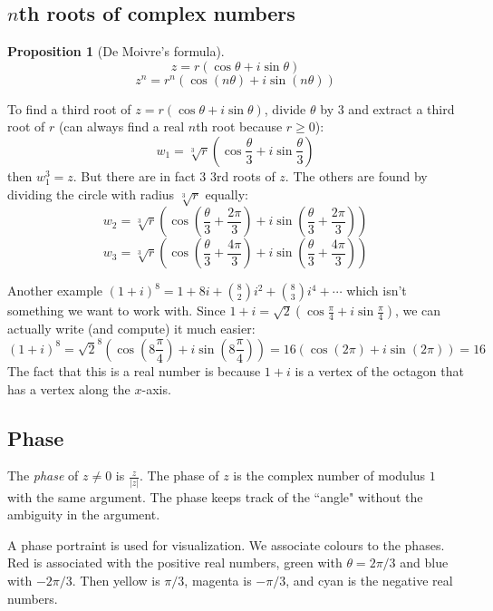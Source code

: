 \documentclass{article}
\theoremstyle{plain}
\newtheorem{proposition}{Proposition}
\theoremstyle{remark}
\begin{document}
\subsection{$n$th roots of complex numbers}
\begin{proposition}[De Moivre's formula]
	\[
		z  = r(\cos\theta + i\sin\theta)
	\]
	\[
		z^n = r^n(\cos(n\theta) + i\sin(n\theta))
	\]
\end{proposition}
To find a third root of $z = r(\cos\theta + i\sin\theta)$,
divide $\theta$ by $3$ and extract a third root of $r$
(can always find a real $n$th root because $r \geq 0$):
\[
	w_1 = \sqrt[3]{r}\left(\cos\frac{\theta}{3} + i\sin\frac{\theta}{3}\right)
\]
then $w_1^3 = z$.
But there are in fact $3$ 3rd roots of $z$.
The others are found by dividing the circle with radius $\sqrt[3]{r}$ equally:
\[
	w_2 = \sqrt[3]{r}\left(\cos\left(\frac{\theta}{3} + \frac{2\pi}{3}\right)
		+ i\sin\left(\frac{\theta}{3} + \frac{2\pi}{3}\right)\right)
\]
\[
	w_3 = \sqrt[3]{r}\left(\cos\left(\frac{\theta}{3} + \frac{4\pi}{3}\right)
		+ i\sin\left(\frac{\theta}{3} + \frac{4\pi}{3}\right)\right)
\]

Another example $(1+i)^8 = 1 + 8i + \binom{8}{2}i^2 + \binom{8}{3}i^4 + \cdots$
which isn't something we want to work with.
Since $1+i = \sqrt{2}\left(\cos\frac{\pi}{4} + i\sin\frac{\pi}{4}\right)$,
we can actually write (and compute) it much easier:
\[
	(1+i)^8 = \sqrt{2}^8\left(\cos\left(8\frac{\pi}{4}\right) +
		i\sin\left(8\frac{\pi}{4}\right)\right)
		= 16 \left(\cos(2\pi) + i\sin(2\pi)\right) = 16
\]
The fact that this is a real number is because $1+i$
is a vertex of the octagon that has a vertex along the $x$-axis.

\subsection{Phase}
The \emph{phase} of $z \neq 0$ is $\frac{z}{|z|}$.
The phase of $z$ is the complex number of modulus $1$ with the same argument.
The phase keeps track of the ``angle" without the ambiguity in the argument.

A phase portraint is used for visualization.
We associate colours to the phases.
Red is associated with the positive real numbers,
green with $\theta = 2\pi/3$ and blue with $-2\pi/3$.
Then yellow is $\pi/3$, magenta is $-\pi/3$,
and cyan is the negative real numbers.
\end{document}
